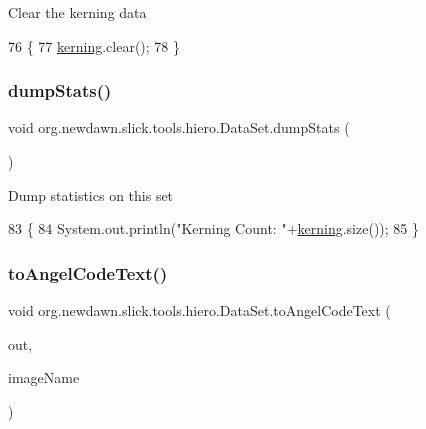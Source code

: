 Clear the kerning data 
\begin{DoxyCode}
76                                \{
77         \mbox{\hyperlink{classorg_1_1newdawn_1_1slick_1_1tools_1_1hiero_1_1_data_set_a6a34bd71965bd3b2e169755305389ab8}{kerning}}.clear();
78     \}
\end{DoxyCode}
\mbox{\label{classorg_1_1newdawn_1_1slick_1_1tools_1_1hiero_1_1_data_set_add4f6b4e306788e704d5749ba27ede82}} 
\subsubsection{\texorpdfstring{dump\+Stats()}{dumpStats()}}
{\footnotesize\ttfamily void org.\+newdawn.\+slick.\+tools.\+hiero.\+Data\+Set.\+dump\+Stats (\begin{DoxyParamCaption}{ }\end{DoxyParamCaption})\hspace{0.3cm}{\ttfamily [inline]}}

Dump statistics on this set 
\begin{DoxyCode}
83                             \{
84         System.out.println(\textcolor{stringliteral}{"Kerning Count: "}+\mbox{\hyperlink{classorg_1_1newdawn_1_1slick_1_1tools_1_1hiero_1_1_data_set_a6a34bd71965bd3b2e169755305389ab8}{kerning}}.size());
85     \}
\end{DoxyCode}
\mbox{\label{classorg_1_1newdawn_1_1slick_1_1tools_1_1hiero_1_1_data_set_adb6e371c799a6a95c3a97ec95cc27e70}} 
\subsubsection{\texorpdfstring{to\+Angel\+Code\+Text()}{toAngelCodeText()}}
{\footnotesize\ttfamily void org.\+newdawn.\+slick.\+tools.\+hiero.\+Data\+Set.\+to\+Angel\+Code\+Text (\begin{DoxyParamCaption}\item[{Print\+Stream}]{out,  }\item[{String}]{image\+Name }\end{DoxyParamCaption})\hspace{0.3cm}{\ttfamily [inline]}}

